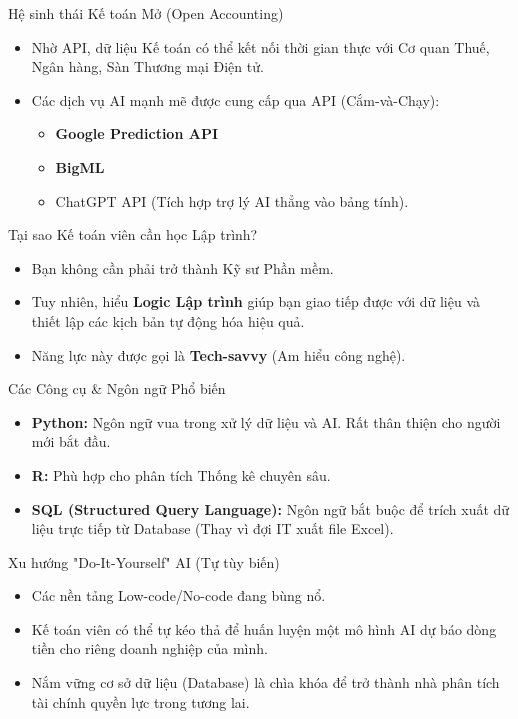 \documentclass[aspectratio=169,12pt]{beamer}
\begin{document}
\begin{frame}{Hệ sinh thái Kế toán Mở (Open Accounting)}
    \begin{itemize}
        \item Nhờ API, dữ liệu Kế toán có thể kết nối thời gian thực với Cơ quan Thuế, Ngân hàng, Sàn Thương mại Điện tử.
        \item Các dịch vụ AI mạnh mẽ được cung cấp qua API (Cắm-và-Chạy):
        \begin{itemize}
            \item \textbf{Google Prediction API}
            \item \textbf{BigML}
            \item ChatGPT API (Tích hợp trợ lý AI thẳng vào bảng tính).
        \end{itemize}
    \end{itemize}
\end{frame}

\begin{frame}{Tại sao Kế toán viên cần học Lập trình?}
    \begin{itemize}
        \item Bạn không cần phải trở thành Kỹ sư Phần mềm.
        \item Tuy nhiên, hiểu \textbf{Logic Lập trình} giúp bạn giao tiếp được với dữ liệu và thiết lập các kịch bản tự động hóa hiệu quả.
        \item Năng lực này được gọi là \textbf{Tech-savvy} (Am hiểu công nghệ).
    \end{itemize}
\end{frame}

\begin{frame}{Các Công cụ \& Ngôn ngữ Phổ biến}
    \begin{itemize}
        \item \textbf{Python:} Ngôn ngữ vua trong xử lý dữ liệu và AI. Rất thân thiện cho người mới bắt đầu.
        \item \textbf{R:} Phù hợp cho phân tích Thống kê chuyên sâu.
        \item \textbf{SQL (Structured Query Language):} Ngôn ngữ bắt buộc để trích xuất dữ liệu trực tiếp từ Database (Thay vì đợi IT xuất file Excel).
    \end{itemize}
\end{frame}

\begin{frame}{Xu hướng "Do-It-Yourself" AI (Tự tùy biến)}
    \begin{itemize}
        \item Các nền tảng Low-code/No-code đang bùng nổ.
        \item Kế toán viên có thể tự kéo thả để huấn luyện một mô hình AI dự báo dòng tiền cho riêng doanh nghiệp của mình.
        \item Nắm vững cơ sở dữ liệu (Database) là chìa khóa để trở thành nhà phân tích tài chính quyền lực trong tương lai.
    \end{itemize}
\end{frame}
\end{document}
